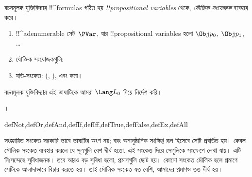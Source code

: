\documentclass[../../../include/open-logic-section]{subfiles}
\begin{document}


বচনমূলক যুক্তিবিদ্যার !!^{formula}s গঠিত হয়
\emph{!!{propositional
    variable}s} থেকে, \emph{যৌক্তিক
  সংযোজক} ব্যবহার করে।

\begin{enumerate}
\item !!^a{denumerable} সেট~$\PVar$, যার !!{propositional variable}s হলো $\Obj p_0$,
  $\Obj p_1$, \dots
{}
\item যৌক্তিক সংযোজকগুলি:
  \startycommalist
\item যতি-সংকেত: (, ), এবং কমা।
\end{enumerate}

বচনমূলক যুক্তিবিদ্যার এই ভাষাটিকে আমরা $\Lang L_0$ দিয়ে নির্দেশ করি।

।

\begin{tagblock}{defNot,defOr,defAnd,defIf,defIff,defTrue,defFalse,defEx,defAll}
\begin{explain}
সংজ্ঞায়িত সংকেত সরকারি ভাবে ভাষাটির অংশ নয়; বরং অনানুষ্ঠানিক সংক্ষিপ্ত
রূপ হিসেবে সেটি প্রবর্তিত হয়। কেবল মৌলিক সংকেত ব্যবহার করলে যে সূত্রগুলি
বেশ দীর্ঘ হতো, এই সংকেত দিয়ে সেগুলিকে সংক্ষেপে লেখা যায়। এটি নিঃসন্দেহে
সুবিধাজনক। তবে আরও বড় সুবিধা হলো, প্রমাণগুলি ছোট হয়। কোনো সংকেত মৌলিক
হলে প্রমাণে সেটিকে আলাদাভাবে বিচার করতে হয়। তাই মৌলিক সংকেত যত বেশি,
আমাদের প্রমাণও তত দীর্ঘ হয়।
\end{explain}
\end{tagblock}
\end{document}
